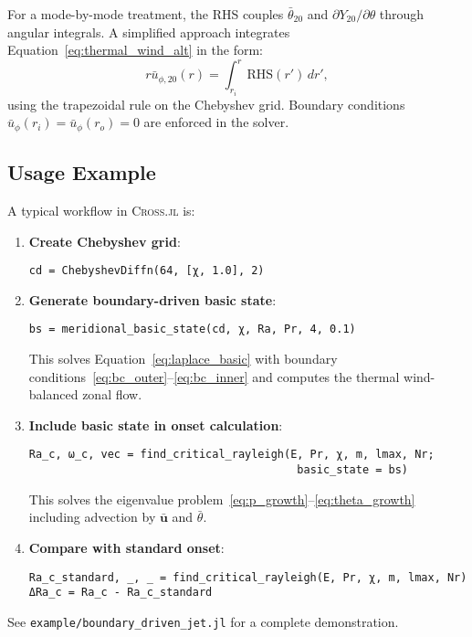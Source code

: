 \documentclass[11pt]{article}
\numberwithin{equation}{section}
\begin{document}
For a mode-by-mode treatment, the RHS couples $\bar{\theta}_{20}$ and $\partial Y_{20}/\partial\theta$ through angular integrals. A simplified approach integrates Equation~\eqref{eq:thermal_wind_alt} in the form:
\begin{equation}
  r \bar{u}_{\phi,20}(r) = \int_{r_i}^{r} \text{RHS}(r') \, dr',
  \label{eq:thermal_wind_integral}
\end{equation}
using the trapezoidal rule on the Chebyshev grid. Boundary conditions $\bar{u}_\phi(r_i)=\bar{u}_\phi(r_o)=0$ are enforced in the solver.

\subsection{Usage Example}

A typical workflow in \textsc{Cross.jl} is:
\begin{enumerate}
  \item \textbf{Create Chebyshev grid}:
\begin{verbatim}
cd = ChebyshevDiffn(64, [χ, 1.0], 2)
\end{verbatim}

  \item \textbf{Generate boundary-driven basic state}:
\begin{verbatim}
bs = meridional_basic_state(cd, χ, Ra, Pr, 4, 0.1)
\end{verbatim}
This solves Equation~\eqref{eq:laplace_basic} with boundary conditions~\eqref{eq:bc_outer}--\eqref{eq:bc_inner} and computes the thermal wind-balanced zonal flow.

  \item \textbf{Include basic state in onset calculation}:
\begin{verbatim}
Ra_c, ω_c, vec = find_critical_rayleigh(E, Pr, χ, m, lmax, Nr;
                                         basic_state = bs)
\end{verbatim}
This solves the eigenvalue problem~\eqref{eq:p_growth}--\eqref{eq:theta_growth} including advection by $\bar{\bm{u}}$ and $\bar{\theta}$.

  \item \textbf{Compare with standard onset}:
\begin{verbatim}
Ra_c_standard, _, _ = find_critical_rayleigh(E, Pr, χ, m, lmax, Nr)
ΔRa_c = Ra_c - Ra_c_standard
\end{verbatim}
\end{enumerate}

See \texttt{example/boundary\_driven\_jet.jl} for a complete demonstration.
\end{document}
